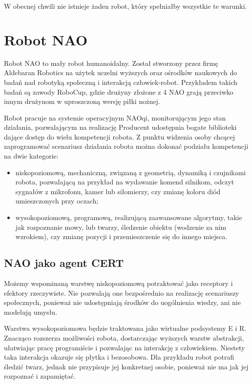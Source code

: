 W obecnej chwili nie istnieje żaden robot, który spełniałby wszystkie te warunki.


\section{Robot NAO}

Robot NAO to mały robot humanoidalny. Został stworzony przez firmę Aldebaran Robotics na użytek uczelni wyższych oraz ośrodków naukowych do badań nad robotyką społeczną i interakcją człowiek-robot. Przykładem takich badań są zawody RoboCup, gdzie drużyny złożone z 4 NAO grają przeciwko innym drużynom w uproszczoną wersję piłki nożnej. 

Robot pracuje na systemie operacyjnym NAOqi, monitorującym jego stan działania, pozwalającym na realizację
Producent udostępnia bogate biblioteki dające dostęp do wielu kompetencji robota. Z punktu widzenia osoby chcącej zaprogramować scenariusz działania robota można dokonać podziału kompetencji na dwie kategorie: 
\begin{itemize}
    \setlength\itemsep{-0.4em}
    \item niskopoziomową, mechaniczną, związaną z geometrią, dynamiką i czujnikami robota, pozwalającą na przykład na wydawanie komend silnikom, odczyt sygnałów z mikrofonu, kamer lub siłomierzy, czy zmianę koloru diód umieszczonych przy oczach; 
    \item wysokopoziomową, programową, realizującą zaawansowane algorytmy, takie jak rozpoznanie mowy, lub twarzy, śledzenie obiektu (wodzenie za nim wzrokiem), czy zmianę pozycji i przemieszczenie się do innego miejsca. 
\end{itemize}

\subsection{NAO jako agent CERT}

Możemy wspominaną warstwę niskopoziomową potraktować jako receptory i efektory rzeczywiste. Nie pozwalają one bezpośrednio na realizację scenariuszy społecznych, ponieważ nie udostępniają środków do uogólnienia wiedzy, ani nie modelują umysłu. 

Warstwa wysokopoziomowa będzie traktowana jako wirtualne podsystemy E i R. Znacząco rozszerza możliwości robota, dostarczając wyższych warstw abstrakcji, ułatwiając pracę programiście i pozwalając na interakcję z człowiekiem. Niestety taka interakcja okazuje się płytka i bezosobowa. Dla przykładu robot potrafi śledzić twarz, jednak nie przypisuje jej konkretnej osobie, ponieważ nie ma jak jej rozpoznać i zapamiętać.

